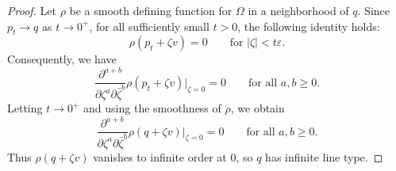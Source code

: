 \documentclass[10pt,a4paper]{amsart}
\newcommand{\eps}{\varepsilon}
\begin{document}
\begin{proof}
	Let \(\rho\) be a smooth defining function for \(\Omega\) in a
	neighborhood of \(q\).  Since \(p_t\to q\) as \(t\to0^+\), for all
	sufficiently small \(t>0\), the following identity holds:
	\[
	\rho(p_t+\zeta v)=0
	\qquad
	\text{for }|\zeta|<t\eps.
	\]
	Consequently, we have
	\[
	\frac{\partial^{a+b}}
	{\partial\zeta^a\partial\bar\zeta^b}
	\rho(p_t+\zeta v)\bigg|_{\zeta=0}
	=0
	\qquad
	\text{for all }a,b\ge0.
	\]
	Letting \(t\to0^+\) and using the smoothness of \(\rho\), we obtain
	\[
	\frac{\partial^{a+b}}
	{\partial\zeta^a\partial\bar\zeta^b}
	\rho(q+\zeta v)\bigg|_{\zeta=0}
	=0
	\qquad
	\text{for all }a,b\ge0.
	\]
	Thus \(\rho(q+\zeta v)\) vanishes to infinite order at \(0\), so \(q\)
	has infinite line type.
\end{proof}
\end{document}

